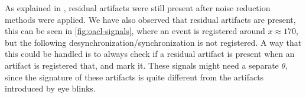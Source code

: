 As explained in \cite{hoffmann2008correction}, residual artifacts were still present after noise reduction methods were applied. We have also observed that residual artifacts are present, this can be seen in \cref{fig:oacl-signals}, where an event is registered around $x \approx 170$, but the following desynchronization/synchronization is not registered. A way that this could be handled is to always check if a residual artifact is present when an artifact is registered that, and mark it. These signals might need a separate $\theta$, since the signature of these artifacts is quite different from the artifacts introduced by eye blinks.
